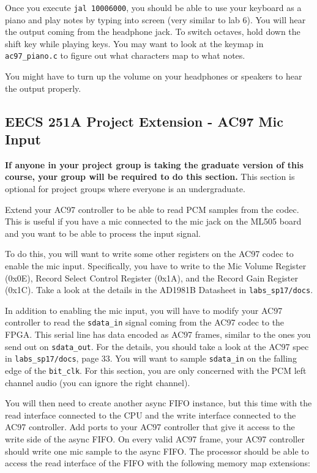 \documentclass[11pt]{article}
\begin{document}
Once you execute \verb|jal 10006000|, you should be able to use your keyboard as a piano and play notes by typing into screen (very similar to lab 6). You will hear the output coming from the headphone jack. To switch octaves, hold down the shift key while playing keys. You may want to look at the keymap in \verb|ac97_piano.c| to figure out what characters map to what notes.

You might have to turn up the volume on your headphones or speakers to hear the output properly.

\subsection{EECS 251A Project Extension - AC97 Mic Input}
\textbf{If anyone in your project group is taking the graduate version of this course, your group will be required to do this section.} This section is optional for project groups where everyone is an undergraduate.

Extend your AC97 controller to be able to read PCM samples from the codec. This is useful if you have a mic connected to the mic jack on the ML505 board and you want to be able to process the input signal. 

To do this, you will want to write some other registers on the AC97 codec to enable the mic input. Specifically, you have to write to the Mic Volume Register (0x0E), Record Select Control Register (0x1A), and the Record Gain Register (0x1C). Take a look at the details in the AD1981B Datasheet in \verb|labs_sp17/docs|.

In addition to enabling the mic input, you will have to modify your AC97 controller to read the \verb|sdata_in| signal coming from the AC97 codec to the FPGA. This serial line has data encoded as AC97 frames, similar to the ones you send out on \verb|sdata_out|. For the details, you should take a look at the AC97 spec in \verb|labs_sp17/docs|, page 33. You will want to sample \verb|sdata_in| on the falling edge of the \verb|bit_clk|. For this section, you are only concerned with the PCM left channel audio (you can ignore the right channel).

You will then need to create another async FIFO instance, but this time with the read interface connected to the CPU and the write interface connected to the AC97 controller. Add ports to your AC97 controller that give it access to the write side of the async FIFO. On every valid AC97 frame, your AC97 controller should write one mic sample to the async FIFO. The processor should be able to access the read interface of the FIFO with the following memory map extensions:
\end{document}
